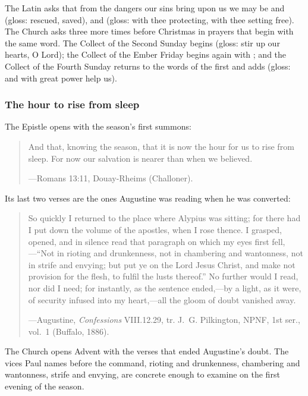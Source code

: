 The Latin asks that from the dangers our sins bring upon us we may be  and
 (gloss: rescued, saved),  and  (gloss:
with thee protecting, with thee setting free). The Church asks three more times before Christmas
in prayers that begin with the same word. The Collect of the Second Sunday begins  (gloss: stir up our hearts, O Lord); the Collect of the Ember Friday begins
again with ; and the Collect of the Fourth Sunday returns to the words of the
first and adds  (gloss: and with great power help us).

\subsubsection{The hour to rise from sleep}

The Epistle opens with the season's first summons:

\begin{quote}
And that, knowing the season, that it is now the hour for us to rise from sleep. For now our
salvation is nearer than when we believed.\par
{\smallskip\noindent\small ---Romans 13:11, Douay-Rheims (Challoner).\par}
\end{quote}

\noindent Its last two verses are the ones Augustine was reading when he was converted:

\begin{quote}
So quickly I returned to the place where Alypius was sitting; for there had I put down the
volume of the apostles, when I rose thence. I grasped, opened, and in silence read that paragraph
on which my eyes first fell,---``Not in rioting and drunkenness, not in chambering and wantonness,
not in strife and envying; but put ye on the Lord Jesus Christ, and make not provision for the
flesh, to fulfil the lusts thereof.'' No further would I read, nor did I need; for instantly, as
the sentence ended,---by a light, as it were, of security infused into my heart,---all the gloom of
doubt vanished away.\par
{\smallskip\noindent\small ---Augustine, \textit{Confessions} VIII.12.29, tr. J.~G. Pilkington,
NPNF, 1st ser., vol.~1 (Buffalo, 1886).\par}
\end{quote}

The Church opens Advent with the verses that ended Augustine's doubt. The vices Paul names before
the command, rioting and drunkenness, chambering and wantonness, strife and envying, are concrete
enough to examine on the first evening of the season.

